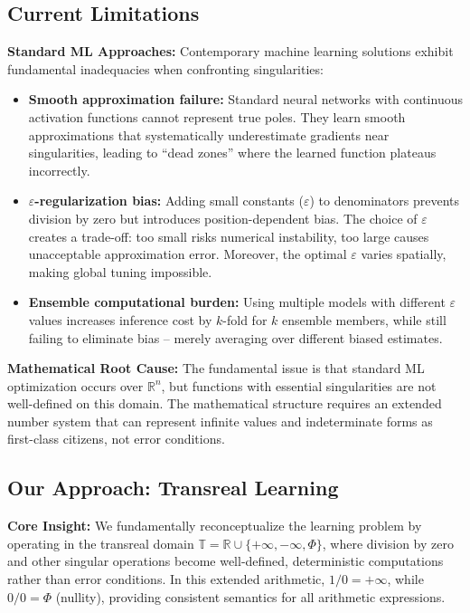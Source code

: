 \documentclass[twoside,11pt]{article}
\newcommand{\TR}{\mathbb{T}}
\newcommand{\RR}{\mathbb{R}}
\begin{document}
\subsection{Current Limitations}
\textbf{Standard ML Approaches:} Contemporary machine learning solutions exhibit fundamental inadequacies when confronting singularities:
\begin{itemize}
\item \textbf{Smooth approximation failure:} Standard neural networks with continuous activation functions cannot represent true poles. They learn smooth approximations that systematically underestimate gradients near singularities, leading to ``dead zones'' where the learned function plateaus incorrectly.
\item \textbf{$\varepsilon$-regularization bias:} Adding small constants ($\varepsilon$) to denominators prevents division by zero but introduces position-dependent bias. The choice of $\varepsilon$ creates a trade-off: too small risks numerical instability, too large causes unacceptable approximation error. Moreover, the optimal $\varepsilon$ varies spatially, making global tuning impossible.
\item \textbf{Ensemble computational burden:} Using multiple models with different $\varepsilon$ values increases inference cost by $k$-fold for $k$ ensemble members, while still failing to eliminate bias -- merely averaging over different biased estimates.
\end{itemize}

\textbf{Mathematical Root Cause:} The fundamental issue is that standard ML optimization occurs over $\mathbb{R}^n$, but functions with essential singularities are not well-defined on this domain. The mathematical structure requires an extended number system that can represent infinite values and indeterminate forms as first-class citizens, not error conditions.
\subsection{Our Approach: Transreal Learning}
\textbf{Core Insight:} We fundamentally reconceptualize the learning problem by operating in the transreal domain $\TR = \RR \cup \{+\infty, -\infty, \Phi\}$, where division by zero and other singular operations become well-defined, deterministic computations rather than error conditions. In this extended arithmetic, $1/0 = +\infty$, while $0/0 = \Phi$ (nullity), providing consistent semantics for all arithmetic expressions.
\end{document}

